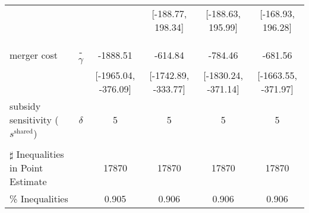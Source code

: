 \begin{tabular}{@{\extracolsep{5pt}}lccccc}
 &  &  & [-188.77, 198.34] & [-188.63, 195.99] & [-168.93, 196.28] \\
 &  &  &  &  &  \\
 &  &  &  &  &  \\
merger cost & -$\gamma$ & -1888.51 & -614.84 & -784.46 & -681.56 \\
 &  & [-1965.04, -376.09] & [-1742.89, -333.77] & [-1830.24, -371.14] & [-1663.55, -371.97] \\
subsidy sensitivity ($s^{\text{shared}}$) & $\delta$ & 5 & 5 & 5 & 5 \\
 &  &  &  &  &  \\
\hline 
$\sharp$ Inequalities in Point Estimate &  & 17870 & 17870 & 17870 & 17870 \\
\% Inequalities &  & 0.905 & 0.906 & 0.906 & 0.906 \\
\bottomrule 
\end{tabular}
